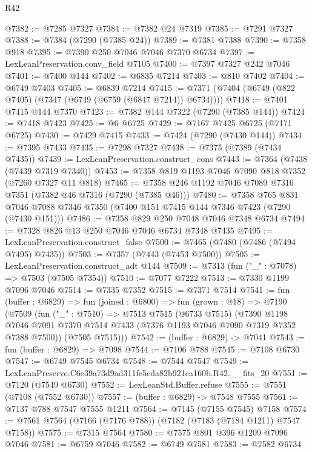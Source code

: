 \begin{lexlean}{R42}
\begin{coremodule}
{@7382 := @7285 @7327
@7384 := @7382 @24 @7319
@7385 := @7291 @7327
@7388 := @7384 (@7290 (@7385 @24))
@7389 := @7381 @7388
@7390 := @7358 @918
@7395 := @7390 @250 @7046 @7046 @7370 @6734
@7397 := LexLeanPreservation.conv_field @7105
@7400 := @7397 @7327 @242 @7046
@7401 := @7400 @144
@7402 := @6835 @7214
@7403 := @810 @7402
@7404 := @6749 @7403
@7405 := @6839 @7214
@7415 := @7371 (@7404 (@6749 (@822 @7405) (@7347 (@6749 (@6759 (@6847 @7214)) @6734))))
@7418 := @7401 @7415 @144 @7370
@7423 := @7382 @144 @7322 (@7290 (@7385 @144))
@7424 := @7418 @7423
@7425 := @6 @6725
@7429 := @7167 @7425 @6725 (@7171 @6725)
@7430 := @7429 @7415
@7433 := @7424 (@7290 (@7430 @144))
@7434 := @7395 @7433
@7435 := @7298 @7327
@7438 := @7375 (@7389 (@7434 @7435))
@7439 := LexLeanPreservation.construct_cons
@7443 := @7364 (@7438 (@7439 @7319 @7340))
@7453 := @7358 @819 @1193 @7046 @7090 @818 @7352 (@7260 @7327 @11 @818)
@7465 := @7358 @246 @1192 @7046 @7089 @7316 @7351 (@7382 @46 @7316 (@7290 (@7385 @46)))
@7480 := @7358
    @765
    @831
    @7046
    @7088
    @7346
    @7350
    (@7400 @151 @7415 @144 @7346 @7423 (@7290 (@7430 @151)))
@7486 := @7358 @829 @250 @7048 @7046 @7348 @6734
@7494 := @7328 @826 @13 @250 @7046 @7046 @6734 @7348 @7435
@7495 := LexLeanPreservation.construct_false
@7500 := @7465 (@7480 (@7486 (@7494 @7495) @7435))
@7503 := @7357 (@7443 (@7453 @7500))
@7505 := LexLeanPreservation.construct_adt @144
@7509 := @7313 (fun ("_" : @7078) => @7503 (@7505 @7354))
@7510 := @7077 @7222
@7513 := @7330 @1199 @7096 @7046
@7514 := @7335 @7352
@7515 := @7371 @7514
@7541 := fun (buffer : @6829) =>
  fun (joined : @6800) =>
  fun (grown : @18) =>
  @7190
    (@7509
      (fun ("_" : @7510) =>
      @7513
        @7515
        (@6733 @7515)
        (@7390
          @1198
          @7046
          @7091
          @7370
          @7514
          @7433
          (@7376 @1193 @7046 @7090 @7319 @7352 @7388 @7500))
        (@7505 @7515)))
@7542 := (buffer : @6829) -> @7041
@7543 := fun (buffer : @6829) => @7098
@7544 := @7106 @788
@7545 := @7108 @6730
@7547 := @6749 @7545 @6734
@7548 := @7544 @7547
@7549 := LexLeanPreserve.C6e39a73d9ad311fe5eda82b921ca160b.R42.__fits_20
@7551 := @7120 (@7549 @6730)
@7552 := LexLeanStd.Buffer.refuse
@7555 := @7551 (@7108 (@7552 @6730))
@7557 := (buffer : @6829) -> @7548 @7555
@7561 := @7137 @788 @7547 @7555 @1211
@7564 := @7145 (@7155 @7545) @7158
@7574 := @7561 @7564 (@7166 (@7176 @788)) (@7182 (@7183 (@7184 @1211) @7547 @7158))
@7575 := @7315 @7564
@7580 := @7575 @801 @396 @1209 @7096 @7046
@7581 := @6759 @7046
@7582 := @6749 @7581
@7583 := @7582 @6734
}
\end{coremodule}
\end{lexlean}
